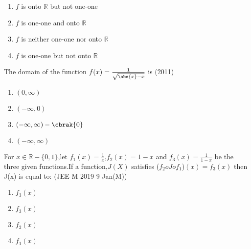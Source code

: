 	     \begin{enumerate}
		     \item $f$ is onto $\mathbb{R}$ but not one-one
		     \item $f$ is one-one and onto $\mathbb{R}$
		     \item $f$ is neither one-one nor onto $\mathbb{R}$
		     \item $f$ is one-one but not onto $\mathbb{R}$
	     \end{enumerate}
     \item The domain of the function $f(x)=\frac{1}{\sqrt{\abs{x}-x}}$ is \hfill(2011)\\
	     \begin{enumerate}
		     \item $(0,\infty)$
		     \item $(-\infty,0)$
		     \item $(-\infty,\infty)-\cbrak{0} $
		     \item $(-\infty,\infty)$
	     \end{enumerate}

     \item For $x\in \mathbb{R}-\{0,1\}$,let $f_1(x)=\frac{1}{x}$,$f_2(x)=1-x$ and $f_3(x)=\frac{1}{1-x}$ be the three given functions.If a function,$J(X)$ satisfies ($f_2oJof_1$)$(x)=f_3(x)$ then J(x) is equal to: \hfill(JEE M 2019-9 Jan(M))
	     \begin{enumerate}
		     \item $f_3(x)$
		     \item $f_3(x)$
		     \item $f_2(x)$
		     \item $f_1(x)$
	     \end{enumerate}
   



